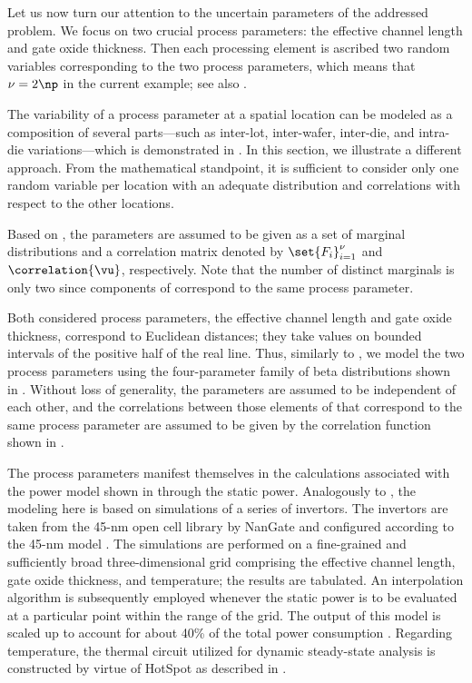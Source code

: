 Let us now turn our attention to the uncertain parameters \vu of the addressed
problem. We focus on two crucial process parameters: the effective channel
length and gate oxide thickness. Then each processing element is ascribed two
random variables corresponding to the two process parameters, which means that
$\nu = 2 \np$ in the current example; see also .

\begin{remark}
The variability of a process parameter at a spatial location can be modeled as a
composition of several parts---such as inter-lot, inter-wafer, inter-die, and
intra-die variations---which is demonstrated in
. In this section, we illustrate a different
approach. From the mathematical standpoint, it is sufficient to consider only
one random variable per location with an adequate distribution and correlations
with respect to the other locations.
\end{remark}

Based on , the parameters \vu are assumed to be given as
a set of marginal distributions and a correlation matrix denoted by
$\set{F_i}_{i = 1}^\nu$ and $\correlation{\vu}$, respectively. Note that the
number of distinct marginals is only two since \np components of \vu correspond
to the same process parameter.

Both considered process parameters, the effective channel length and gate oxide
thickness, correspond to Euclidean distances; they take values on bounded
intervals of the positive half of the real line. Thus, similarly to
, we model the two process parameters using
the four-parameter family of beta distributions shown in
. Without loss of generality, the parameters are assumed
to be independent of each other, and the correlations between those elements of
\vu that correspond to the same process parameter are assumed to be given by the
correlation function shown in .

The process parameters manifest themselves in the calculations associated with
the power model shown in  through the static power.
Analogously to , the modeling here is based on
 simulations of a series of  invertors. The invertors are
taken from the 45-nm open cell library by NanGate \cite{nangate} and configured
according to the 45-nm   model \cite{ptm}. The simulations are
performed on a fine-grained and sufficiently broad three-dimensional grid
comprising the effective channel length, gate oxide thickness, and temperature;
the results are tabulated. An interpolation algorithm is subsequently employed
whenever the static power is to be evaluated at a particular point within the
range of the grid. The output of this model is scaled up to account for about
40\% of the total power consumption \cite{liu2007}. Regarding temperature, the
thermal  circuit utilized for dynamic steady-state analysis is
constructed by virtue of HotSpot \cite{skadron2003} as described in
.

